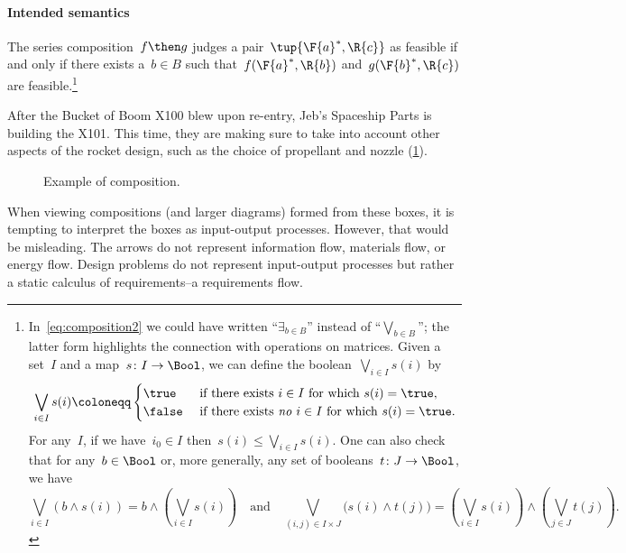 \paragraph{Intended semantics}
The series composition~$f\then g$ judges a pair~$\tup{\F{a}^*,\R{c}}$ as feasible if and only if there exists a~$b \in B$ such that~$f(\F{a}^*,\R{b})$ and~$g(\F{b}^*,\R{c})$ are feasible.\footnote{In~\cref{eq:composition2} we could have written ``$\exists_{b\in B}$''
instead of ``$\bigvee_{b\in B}$''; the latter form highlights the connection
with operations on matrices. Given a set~$I$ and a map~$s\colon I\to\Bool$, we can define the boolean~$\bigvee_{i\in I}s(i)$ by
  \begin{equation*}
    \bigvee_{i\in I}s(i)\coloneqq
    \begin{cases}
      \true&\text{ if there exists }i\in I\text{ for which }s(i)=\true,\\
      \false&\text{ if there exists \emph{no} }i\in I\text{ for which }s(i)=\true.
    \end{cases}
  \end{equation*}
  For any~$I$, if we have~$i_0\in I$ then~$s(i)\leq\bigvee_{i\in I}s(i)$. One can also check that for any~$b\in\Bool$ or, more generally, any set of booleans~$t\colon J\to\Bool$, we have
  \begin{equation*}
    \bigvee_{i\in I}(b\wedge s(i))=b\wedge\left(\bigvee_{i\in I}s(i)\right)
    \quad\text{and}\quad
    \bigvee_{(i,j)\in I\times  J}\big(s(i)\wedge t(j)\big)=\left(\bigvee_{i\in I}s(i)\right)\wedge\left(\bigvee_{j\in J} t(j)\right).
  \end{equation*}
}

\begin{example}
  After the Bucket of Boom X100 blew upon re-entry, Jeb's Spaceship Parts is building the X101. This time, they are making sure to take into account other aspects of the rocket design, such as the choice of propellant and nozzle (\cref{fig:examplecomposition}).
  \begin{figure}[h!]
    \begin{center}
    \end{center}
    \caption{Example of composition. \label{fig:examplecomposition}}
  \end{figure}
\end{example}

\begin{remark}
  When viewing compositions (and larger diagrams) formed from these boxes, it is tempting to interpret the boxes as input-output processes. However, that would be misleading. The arrows do not represent information flow, materials flow, or energy flow. Design problems do not represent input-output processes but rather a static calculus of requirements--a requirements flow.
\end{remark}

